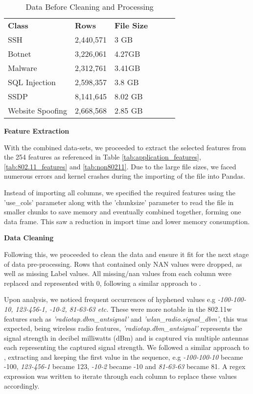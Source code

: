 \begin{table}[H]
\centering
\begin{tabular}{llllll}
\cline{1-3}
\textbf{Class}  & \textbf{Rows} & \textbf{File Size} &  &  &  \\ \cline{1-3}
SSH              & 2,440,571     & 3 GB               &  &  &  \\
Botnet           & 3,226,061     & 4.27GB             &  &  &  \\
Malware          & 2,312,761     & 3.41GB             &  &  &  \\
SQL Injection    & 2,598,357     & 3.8 GB             &  &  &  \\
SSDP             & 8,141,645     & 8.02 GB            &  &  &  \\
Website Spoofing & 2,668,568     & 2.85 GB            &  &  &  \\ \cline{1-3}
\end{tabular}
\caption{Data Before Cleaning and Processing}
\label{tab:full_data}
\end{table}

\medskip

\textbf{Feature Extraction}

\smallskip
With the combined data-sets, we proceeded to extract the selected features from the 254 features as referenced in Table \ref{tab:application_features}, \ref{tab:802.11_features} and \ref{tab:non80211}. Due to the large file sizes, we faced numerous errors and kernel crashes during the importing of the file into Pandas. 

Instead of importing all columns, we specified the required features using the 'use\_cols' parameter along with the 'chunksize' parameter to read the file in smaller chunks to save memory and eventually combined together, forming one data frame. This saw a reduction in import time and lower memory consumption.

\medskip
\textbf{Data Cleaning}

\smallskip
Following this, we proceeded to clean the data and ensure it fit for the next stage of data pre-processing. Rows that contained only NAN values were dropped, as well as missing Label values. All missing/nan values from each column were replaced and represented with 0, following a similar approach to \textcite{s22155633}.

\smallskip
Upon analysis, we noticed frequent occurrences of hyphened values e.g \textit{-100-100-10, 123-456-1, -10-2, 81-63-63 etc.} These were more notable in the 802.11w features such as \textit{'radiotap.dbm\_antsignal'} and \textit{'wlan\_radio.signal\_dbm'}, this was expected, being wireless radio features, \textit{'radiotap.dbm\_antsignal'} represents the signal strength in decibel milliwatts (dBm) and is captured via multiple antennas each representing the captured signal strength. We followed a similar approach to \parencite{s22155633}, extracting and keeping the first value in the sequence, e.g \textit{-100-100-10} became -100, \textit{123-456-1} became 123, \textit{-10-2} became -10 and \textit{81-63-63} became 81. A regex expression was written to iterate through each column to replace these values accordingly.

